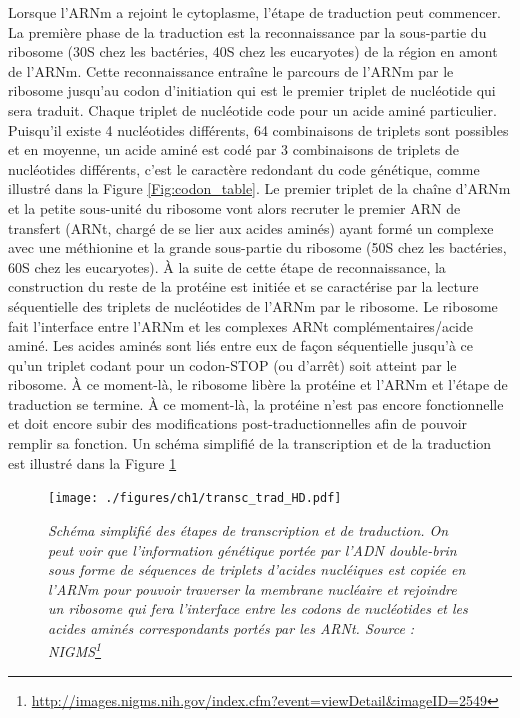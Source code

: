 Lorsque l'ARNm a rejoint le cytoplasme, l'étape de traduction peut commencer. La première phase de la traduction est la reconnaissance par la sous-partie du ribosome (30S chez les bactéries, 40S chez les eucaryotes) de la région en amont de l'ARNm. Cette reconnaissance entraîne le parcours de l'ARNm par le ribosome jusqu'au codon d'initiation qui est le premier triplet de nucléotide qui sera traduit. Chaque triplet de nucléotide code pour un acide aminé particulier. Puisqu'il existe 4 nucléotides différents, 64 combinaisons de triplets sont possibles et en moyenne, un acide aminé est codé par 3 combinaisons de triplets de nucléotides différents, c'est le caractère redondant du code génétique, comme illustré dans la Figure \ref{Fig:codon_table}.
Le premier triplet de la chaîne d'ARNm et la petite sous-unité du ribosome vont alors recruter le premier ARN de transfert (ARNt, chargé de se lier aux acides aminés) ayant formé un complexe avec une méthionine et la grande sous-partie du ribosome (50S chez les bactéries, 60S chez les eucaryotes). À la suite de cette étape de reconnaissance, la construction du reste de la protéine est initiée et se caractérise par la lecture séquentielle des triplets de nucléotides de l'ARNm par le ribosome. Le ribosome fait l'interface entre l'ARNm et les complexes ARNt complémentaires/acide aminé. Les acides aminés sont liés entre eux de façon séquentielle jusqu'à ce qu'un triplet codant pour un codon-STOP (ou d'arrêt) soit atteint par le ribosome. À ce moment-là, le ribosome libère la protéine et l'ARNm et l'étape de traduction se termine. À ce moment-là, la protéine n'est pas encore fonctionnelle et doit encore subir des modifications post-traductionnelles afin de pouvoir remplir sa fonction. Un schéma simplifié de la transcription et de la traduction est illustré dans la Figure \ref{Fig:transc_trad_HD}

\begin{figure}[htb]
  \centering
  {\texttt{[image: ./figures/ch1/transc\_trad\_HD.pdf]}}
    \caption[Schéma simplifié des étapes de transcription et de traduction.]{\it Schéma simplifié des étapes de transcription et de traduction. On peut voir que l'information génétique portée par l'ADN double-brin sous forme de séquences de triplets d'acides nucléiques est copiée en l'ARNm pour pouvoir traverser la membrane nucléaire et rejoindre un ribosome qui fera l'interface entre les codons de nucléotides et les acides aminés correspondants portés par les ARNt. Source : NIGMS\footnote{\url{http://images.nigms.nih.gov/index.cfm?event=viewDetail&imageID=2549}}}
    \label{Fig:transc_trad_HD}
\end{figure}

